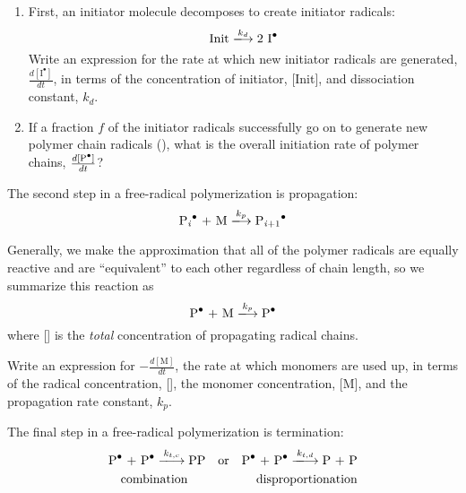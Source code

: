 \begin{activity}
\begin{ctqs}
\begin{enumerate}
			\item First, an initiator molecule decomposes to create initiator radicals:
				\begin{equation*}
					\text{Init} \xlongrightarrow{k_d} \text{2 \ce{I^.}}
				\end{equation*}	
				Write an expression for the rate at which new initiator radicals are generated, $\frac{d[\text{I}^{\bullet}]}{dt}$, in terms of the concentration of initiator, [Init], and dissociation constant, $k_d$.
		
				\begin{solution}[1.25in]
				\end{solution}
		
			\item If a fraction $f$ of the initiator radicals successfully go on to generate new polymer chain radicals (), what is the overall initiation rate of polymer chains, $\frac{d[\text{\ce{P^.}}]}{dt}$?
		
				\begin{solution}[1.25in]
				\end{solution}
		
		\end{enumerate}
		
	\question The second step in a free-radical polymerization is propagation:
		\begin{equation*}
			\text{\ce{P_i^.} + M} \xlongrightarrow{k_p} \text{\ce{P_{i+1}^.}}
		\end{equation*}
		
		Generally, we make the approximation that all of the polymer radicals are equally reactive and are ``equivalent'' to each other regardless of chain length, so we summarize this reaction as
		\begin{equation*}
			\text{\ce{P^.} + M} \xlongrightarrow{k_p} \text{\ce{P^.}}
		\end{equation*}
		where [] is the \emph{total} concentration of propagating radical chains.
	
		Write an expression for $-\frac{d[\text{M}]}{dt}$, the rate at which monomers are used up, in terms of the radical concentration, [], the monomer concentration, [M], and the propagation rate constant, $k_p$.
		
		\begin{solution}[1.25in]
		\end{solution}
		
	\question The final step in a free-radical polymerization is termination:
		\begin{align*}
			\text{\ce{P^.} + \ce{P^.}} \xlongrightarrow{k_{t,c}} \text{\ce{PP}} && \text{or} && \text{\ce{P^.} + \ce{P^.}} \xlongrightarrow{k_{t,d}} \text{P + P}\\
			\text{combination\hspace{0.5cm}} && && \text{disproportionation}
		\end{align*}
		

\end{ctqs}
\end{activity}
